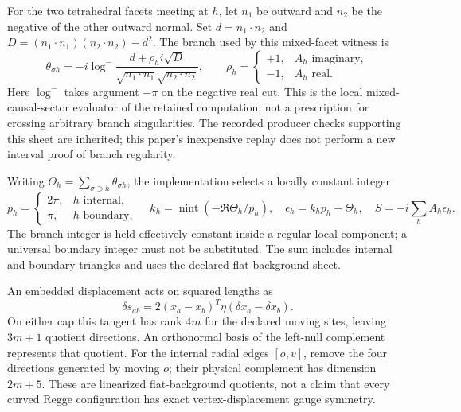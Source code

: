 \documentclass[11pt]{article}
\theoremstyle{remark}\newtheorem{remark}[theorem]{Remark}
\begin{document}
For the two tetrahedral facets meeting at $h$, let $n_1$ be outward and $n_2$ be the negative of the other outward normal.
Set $d=n_1\cdot n_2$ and $D=(n_1\cdot n_1)(n_2\cdot n_2)-d^2$.
The branch used by this mixed-facet witness is
\begin{equation}
\theta_{\sigma h}=-i\log^-
\frac{d+\rho_h i\sqrt{D}}{
\sqrt{n_1\cdot n_1}\sqrt{n_2\cdot n_2}},\qquad
\rho_h=\begin{cases}+1,&A_h\text{ imaginary},\\-1,&A_h\text{ real}.
\end{cases}
\label{eq:angle}
\end{equation}
Here $\log^-$ takes argument $-\pi$ on the negative real cut.
This is the local mixed-causal-sector evaluator of the retained computation, not a prescription for crossing arbitrary branch singularities.
The recorded producer checks supporting this sheet are inherited; this paper's inexpensive replay does not perform a new interval proof of branch regularity.

Writing $\Theta_h=\sum_{\sigma\supset h}\theta_{\sigma h}$, the implementation selects a locally constant integer
\begin{equation}
p_h=\begin{cases}2\pi,&h\text{ internal},\\\pi,&h\text{ boundary},\end{cases}
\quad k_h=\operatorname{nint}(-\Re\Theta_h/p_h),\quad
\epsilon_h=k_hp_h+\Theta_h,
\quad S=-i\sum_h A_h\epsilon_h.
\label{eq:action}
\end{equation}
The branch integer is held effectively constant inside a regular local component; a universal boundary integer must not be substituted.
The sum includes internal and boundary triangles and uses the declared flat-background sheet.

An embedded displacement acts on squared lengths as
\begin{equation}
\delta s_{ab}=2(x_a-x_b)^T\eta(\delta x_a-\delta x_b).
\label{eq:tangent}
\end{equation}
On either cap this tangent has rank $4m$ for the declared moving sites, leaving $3m+1$ quotient directions.
An orthonormal basis of the left-null complement represents that quotient.
For the internal radial edges $[o,v]$, remove the four directions generated by moving $o$; their physical complement has dimension $2m+5$.
These are linearized flat-background quotients, not a claim that every curved Regge configuration has exact vertex-displacement gauge symmetry.
\end{document}
